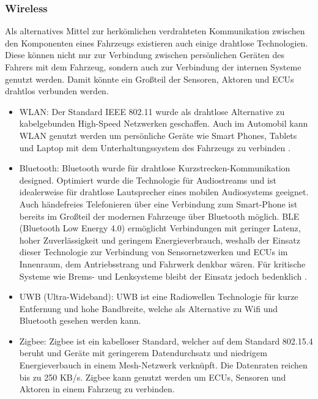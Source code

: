         \subsubsection{Wireless}
        Als alternatives Mittel zur herkömlichen verdrahteten Kommunikation zwischen den Komponenten eines Fahrzeugs existieren auch einige drahtlose Technologien.
        Diese können nicht nur zur Verbindung zwischen persönlichen Geräten des Fahrers mit dem Fahrzeug, sondern auch zur Verbindung der internen Systeme genutzt werden.
        Damit könnte ein Großteil der Sensoren, Aktoren und ECUs drahtlos verbunden werden.
            \begin{itemize}
                \item WLAN: Der Standard IEEE 802.11 wurde als drahtlose Alternative zu kabelgebunden High-Speed
                Netzwerken geschaffen. Auch im Automobil kann WLAN genutzt werden um persönliche Geräte wie Smart Phones,
                Tablets und Laptop mit dem Unterhaltungssystem des Fahrzeugs zu verbinden \cite{TW_huang2018vehicle}. 
                \item Bluetooth: Bluetooth wurde für drahtlose Kurzstrecken-Kommunikation designed. Optimiert wurde die
                Technologie für Audiostreams und ist idealerweise für drahtlose Lautsprecher eines mobilen Audiosystems geeignet.
                Auch händefreies Telefonieren über eine Verbindung zum Smart-Phone ist bereits im Großteil der modernen Fahrzeuge 
                über Bluetooth möglich. BLE (Bluetooth Low Energy 4.0) ermöglicht Verbindungen mit geringer Latenz, hoher Zuverlässigkeit
                und geringem Energieverbrauch, weshalb der Einsatz dieser Technologie zur Verbindung von Sensornetzwerken und ECUs im Innenraum, 
                dem Antriebsstrang und Fahrwerk denkbar wären. Für kritische Systeme wie Brems- und Lenksysteme bleibt der Einsatz jedoch bedenklich \cite{TW_huang2018vehicle}.
                \item UWB (Ultra-Wideband): UWB ist eine Radiowellen Technologie für kurze Entfernung und hohe Bandbreite, welche als Alternative zu Wifi und Bluetooth gesehen werden kann.
                \item Zigbee: Zigbee ist ein kabelloser Standard, welcher auf dem Standard 802.15.4 beruht und Geräte mit geringerem Datendurchsatz und niedrigem Energieverbauch in einem 
                Mesh-Netzwerk verknüpft. Die Datenraten reichen bis zu 250 KB/s. Zigbee kann genutzt werden um ECUs, Sensoren und Aktoren in einem Fahrzeug zu verbinden.
            \end{itemize}
